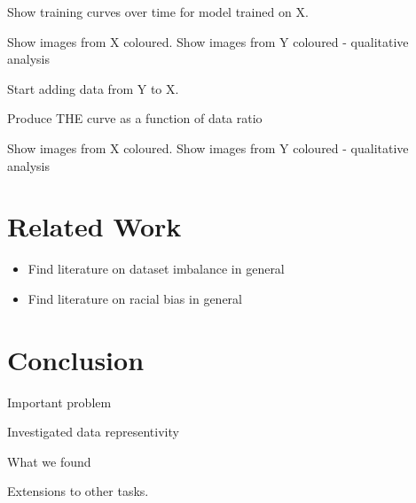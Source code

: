 \documentclass[conference]{IEEEtran}
\begin{document}
Show training curves over time for model trained on X. 

Show images from X coloured.
Show images from Y coloured - qualitative analysis

Start adding data from Y to X. 

Produce THE curve as a function of data ratio

Show images from X coloured.
Show images from Y coloured - qualitative analysis



\section{Related Work}

\begin{itemize}
    \item Find literature on dataset imbalance in general
    \item Find literature on racial bias in general
\end{itemize}

\section{Conclusion}

Important problem

Investigated data representivity

What we found

Extensions to other tasks.





\end{document}
